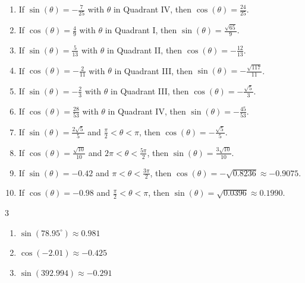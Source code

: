 \documentclass{ximera}
\begin{document}
\begin{enumerate}

\setcounter{enumi}{\value{HW}}

\item If $\sin(\theta) = -\frac{7}{25}$ with $\theta$ in Quadrant IV, then $\cos(\theta) = \frac{24}{25}$.
\item If $\cos(\theta) = \frac{4}{9}$ with $\theta$ in Quadrant I, then $\sin(\theta) = \frac{\sqrt{65}}{9}$.
\item If $\sin(\theta) = \frac{5}{13}$ with $\theta$ in Quadrant II, then $\cos(\theta) = -\frac{12}{13}$.
\item If $\cos(\theta) = -\frac{2}{11}$ with $\theta$ in Quadrant III, then $\sin(\theta) = -\frac{\sqrt{117}}{11}$.
\item If $\sin(\theta) = -\frac{2}{3}$ with $\theta$ in Quadrant III, then $\cos(\theta) = -\frac{\sqrt{5}}{3}$.
\item If $\cos(\theta) = \frac{28}{53}$ with $\theta$ in Quadrant IV, then $\sin(\theta) = -\frac{45}{53}$.
\item  If $\sin(\theta) = \frac{2\sqrt{5}}{5}$ and $\frac{\pi}{2} < \theta < \pi$, then $\cos(\theta) = -\frac{\sqrt{5}}{5}$.
\item  If $\cos(\theta) = \frac{\sqrt{10}}{10}$ and $2\pi < \theta < \frac{5\pi}{2}$, then $\sin(\theta)  = \frac{3 \sqrt{10}}{10}$.
\item  If $\sin(\theta) = -0.42$ and $\pi < \theta < \frac{3\pi}{2}$, then $\cos(\theta) = -\sqrt{0.8236} \approx -0.9075$.
\item  If $\cos(\theta) = -0.98$ and $\frac{\pi}{2} < \theta < \pi$, then $\sin(\theta) = \sqrt{0.0396} \approx 0.1990$.

\setcounter{HW}{\value{enumi}}

\end{enumerate}


\begin{multicols}{3}

\begin{enumerate}

\setcounter{enumi}{\value{HW}}

\item $\sin(78.95^{\circ}) \approx 0.981$
\item $\cos(-2.01) \approx -0.425$
\item $\sin(392.994) \approx -0.291$

\setcounter{HW}{\value{enumi}}

\end{enumerate}

\end{multicols}
\end{document}
